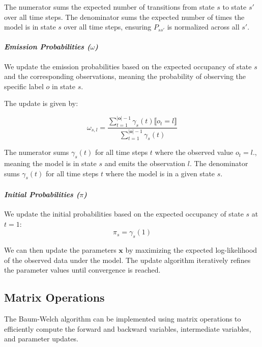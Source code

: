 The numerator sums the expected number of transitions from state $s$ to state $s'$ over all time steps.
The denominator sums the expected number of times the model is in state $s$ over all time steps, ensuring $P_{ss'}$ is normalized across all $s'$.

\paragraph*{\textit{Emission Probabilities ($\omega$)}}

We update the emission probabilities based on the expected occupancy of state $s$ and the corresponding observations, meaning the probability of observing the specific label $o$ in state $s$.

The update is given by:

\begin{equation}
    \omega_{s, l} = \frac{\sum_{t = 1}^{|\mathbf{o}|-1} \gamma_s(t) \lBrack o_t = l \rBrack}{\sum_{t = 1}^{|\mathbf{o}|-1} \gamma_s(t)}
    \label{eq:omega}
\end{equation}

The numerator sums $\gamma_s(t)$ for all time steps $t$ where the observed value $o_t = l$., meaning the model is in state $s$ and emits the observation $l$.
The denominator sums $\gamma_s(t)$ for all time steps $t$ where the model is in a given state $s$.


\paragraph*{\textit{Initial Probabilities ($\pi$)}}

We update the initial probabilities based on the expected occupancy of state $s$ at $t = 1$:
\begin{equation}
    \pi_s = \gamma_s(1)
    \label{eq:initial-probabilities}
\end{equation}

We can then update the parameters $\mathbf{x}$ by maximizing the expected log-likelihood of the observed data under the model.
The update algorithm iteratively refines the parameter values until convergence is reached.

\subsection{Matrix Operations}\label{subsec:matrix-operations}
The Baum-Welch algorithm can be implemented using matrix operations to efficiently compute the forward and backward variables, intermediate variables, and parameter updates.

